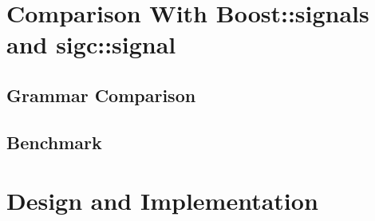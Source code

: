 \documentclass[9pt,onside,a4paper]{article}
\begin{document}
\section{Comparison With Boost::signals and sigc::signal}
\subsection{Grammar Comparison}
\subsection{Benchmark}

\section{Design and Implementation}
\end{document}
